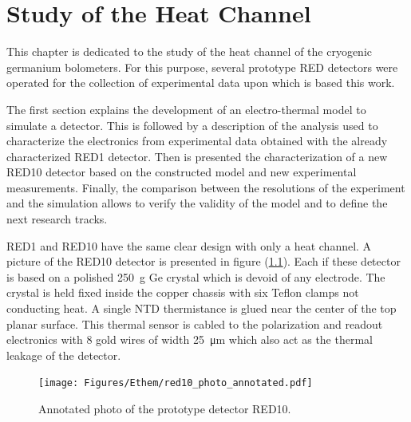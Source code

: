 
\chapter{Study of the Heat Channel}

\label{ChapterEthem} %


This chapter is dedicated to the study of the heat channel of the cryogenic germanium bolometers. For this purpose, several prototype RED detectors were operated for the collection of experimental data upon which is based this work.

The first section explains the development of an electro-thermal model to simulate a detector. This is followed by a description of the analysis used to characterize the electronics from experimental data obtained with the already characterized RED1 detector. Then is presented the characterization of a new RED10 detector based on the constructed model and new experimental measurements. Finally, the comparison between the resolutions of the experiment and the simulation allows to verify the validity of the model and to define the next research tracks.

RED1 and RED10 have the same clear design with only a heat channel. A picture of the RED10 detector is presented in figure (\ref{fig:red10-photo}).
Each if these detector is based on a polished \SI{250}{\g} Ge crystal which is devoid of any electrode. The crystal is held fixed inside the copper chassis with six Teflon clamps not conducting heat. A single NTD thermistance is glued near the center of the top planar surface. This thermal sensor is cabled to the polarization and readout electronics with 8 gold wires of width \SI{25}{\micro\meter} which also act as the thermal leakage of the detector.

\begin{figure}[!h]
\centering
\begin{center}
\texttt{[image: Figures/Ethem/red10\_photo\_annotated.pdf]}
\end{center}
\caption{Annotated photo of the prototype detector RED10.}
\label{fig:red10-photo}
\end{figure}

